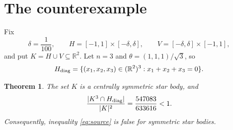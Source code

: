 \documentclass[11pt]{article}
\newtheorem{theorem}{Theorem}
\newcommand{\R}{\mathbb R}
\newcommand{\1}{\mathbf 1}
\begin{document}
\section{The counterexample}

Fix
\[
 \delta=\frac1{100},\qquad
 H=[-1,1]\times[-\delta,\delta],\qquad
 V=[-\delta,\delta]\times[-1,1],
\]
and put $K=H\cup V\subseteq\R^2$.  Let $n=3$ and
$\theta=(1,1,1)/\sqrt3$, so
\[
 H_{\rm diag}=\{(x_1,x_2,x_3)\in(\R^2)^3:x_1+x_2+x_3=0\}.
\]

\begin{theorem}
The set $K$ is a centrally symmetric star body, and
\[
 \frac{|K^3\cap H_{\rm diag}|}{|K|^2}
 =\frac{547083}{633616}<1.
\]
Consequently, inequality \eqref{eq:source} is false for symmetric star
bodies.
\end{theorem}
\end{document}
